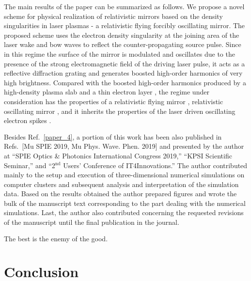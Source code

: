 \documentclass[10pt, a4paper, twoside, openright]{report}
\newcommand{\q}[1]{``#1''} %
\begin{document}
The main results of the paper can be summarized as follows. We propose a novel scheme for physical realization of relativistic mirrors based on the density singularities in laser plasmas - a relativistic flying forcibly oscillating mirror. The proposed scheme uses the electron density singularity at the joining area of the laser wake and bow waves to reflect the counter-propagating source pulse. Since in this regime the surface of the mirror is modulated and oscillates due to the presence of the strong electromagnetic field of the driving laser pulse, it acts as a reflective diffraction grating and generates boosted high-order harmonics of very high brightness. Compared with the boosted high-order harmonics produced by a high-density plasma slab and a thin electron layer \cite{Kulagin2007, Esirkepov2009, Wu2010}, the regime under consideration has the properties of a relativistic flying mirror \cite{Bulanov2003}, relativistic oscillating mirror \cite{Bulanov1994, Naumova2004}, and it inherits the properties of the laser driven oscillating electron spikes \cite{Pirozhkov2014, Pirozhkov2017}. 

Besides Ref.~\ref{paper_4}, a portion of this work has been also published in Refs.~[Mu SPIE 2019, Mu Phys. Wave. Phen. 2019] and presented by the author at \q{SPIE Optics \& Photonics International Congress 2019,} \q{KPSI Scientific Seminar,} and \q{2$ ^{\mathrm{nd}} $ Users' Conference of IT4Innovations.} The author contributed mainly to the setup and execution of three-dimensional numerical simulations on computer clusters and subsequent analysis and interpretation of the simulation data. Based on the results obtained the author prepared figures and wrote the bulk of the manuscript text corresponding to the part dealing with the numerical simulations. Last, the author also contributed concerning the requested revisions of the manuscript until the final publication in the journal.






\begin{savequote}[0.405\linewidth]
	\begin{fquote}
		[-- Voltaire (1694 -- 1778)] The best is the enemy of the good. 
	\end{fquote}
\end{savequote}

\chapter{Conclusion\label{chap:conclusion}}
%
\end{document}
